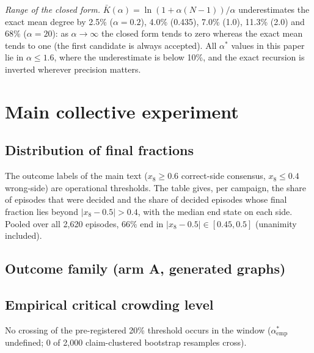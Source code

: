\documentclass[11pt]{article}
\newcommand{\astar}{\alpha^{*}}
\begin{document}
\emph{Range of the closed form.} $\bar K(\alpha) = \ln(1 + \alpha(N-1))/\alpha$
underestimates the exact mean degree by 2.5\% ($\alpha = 0.2$), 4.0\%
(0.435), 7.0\% (1.0), 11.3\% (2.0) and 68\% ($\alpha = 20$): as
$\alpha \to \infty$ the closed form tends to zero whereas the exact mean tends
to one (the first candidate is always accepted). All $\astar$ values in this
paper lie in $\alpha \le 1.6$, where the underestimate is below 10\%, and the
exact recursion is inverted wherever precision matters.

\section{Main collective experiment}

\subsection{Distribution of final fractions}

The outcome labels of the main text ($x_8 \ge 0.6$ correct-side consensus,
$x_8 \le 0.4$ wrong-side) are operational thresholds. The table gives, per
campaign, the share of episodes that were decided and the share of decided
episodes whose final fraction lies beyond $|x_8 - 0.5| > 0.4$, with the
median end state on each side. Pooled over all 2{,}620 episodes, 66\% end in
$|x_8 - 0.5| \in [0.45, 0.5]$ (unanimity included).
\begin{center}
\small
\resizebox{\textwidth}{!}{}
\end{center}

\subsection{Outcome family (arm A, generated graphs)}
\begin{center}
\small

\end{center}

\subsection{Empirical critical crowding level}
\begin{center}

\end{center}
No crossing of the pre-registered 20\% threshold occurs in the window
($\astar_{\mathrm{emp}}$ undefined; 0 of 2{,}000 claim-clustered bootstrap
resamples cross).
\end{document}
